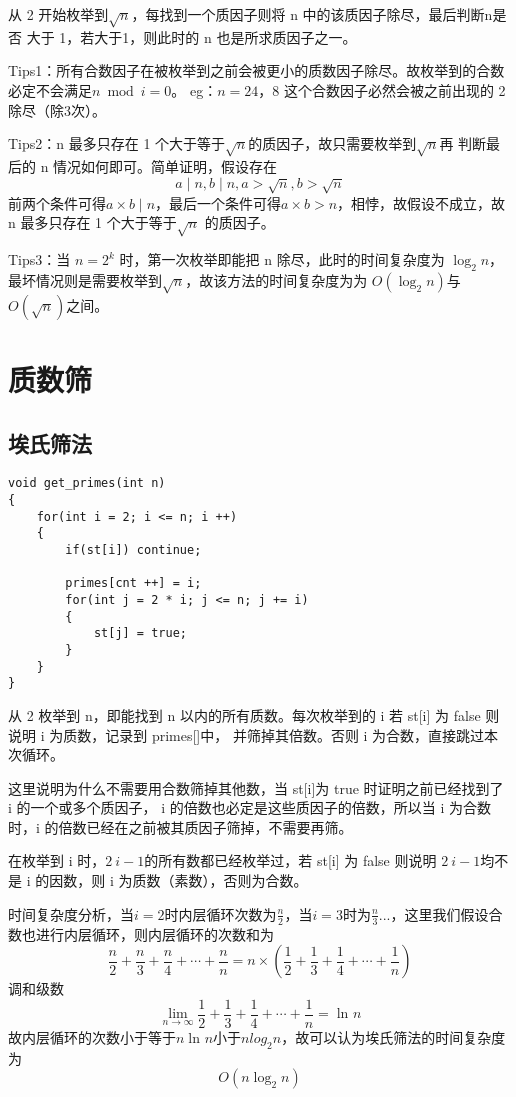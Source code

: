 \documentclass[]{book}
\begin{document}
从 2 开始枚举到$\sqrt{n}$，每找到一个质因子则将 n 中的该质因子除尽，最后判断n是否
大于 1，若大于1，则此时的 n 也是所求质因子之一。

Tips1：所有合数因子在被枚举到之前会被更小的质数因子除尽。故枚举到的合数必定不会满足$n \bmod i = 0$。
eg：$n = 24$，8 这个合数因子必然会被之前出现的 2 除尽（除3次）。

Tips2：n 最多只存在 1 个大于等于$\sqrt{n}$的质因子，故只需要枚举到$\sqrt{n}$再
判断最后的 n 情况如何即可。简单证明，假设存在
\[ a \mid n, b \mid n, a>\sqrt{n}, b>\sqrt{n}\]
前两个条件可得$a \times b \mid n$，最后一个条件可得$a \times b > n$，相悖，故假设不成立，故 n 最多只存在
1 个大于等于$ \sqrt{n}$ 的质因子。

Tips3：当 $n = 2^k$ 时，第一次枚举即能把 n 除尽，此时的时间复杂度为 $\log_{2}{n}$，
最坏情况则是需要枚举到$\sqrt{n}$，故该方法的时间复杂度为为 $O(\log_{2}{n})$与$O(\sqrt{n})$之间。
\section{质数筛}
\subsection{埃氏筛法}
\begin{lstlisting}
void get_primes(int n)
{
    for(int i = 2; i <= n; i ++)
    {
        if(st[i]) continue;
        
        primes[cnt ++] = i;
        for(int j = 2 * i; j <= n; j += i)
        {
            st[j] = true;
        }
    }
}
\end{lstlisting}

从 2 枚举到 n，即能找到 n 以内的所有质数。每次枚举到的 i 若 st[i] 为 false 则说明 i 为质数，记录到 primes[]中，
并筛掉其倍数。否则 i 为合数，直接跳过本次循环。

这里说明为什么不需要用合数筛掉其他数，当 st[i]为 true 时证明之前已经找到了 i 的一个或多个质因子，
i 的倍数也必定是这些质因子的倍数，所以当 i 为合数时，i 的倍数已经在之前被其质因子筛掉，不需要再筛。

在枚举到 i 时，$2 ~ i-1$的所有数都已经枚举过，若 st[i] 为 false 则说明 $2 ~ i-1$均不是 i 的因数，则 i 为质数（素数），否则为合数。

时间复杂度分析，当$i=2$时内层循环次数为$\frac{n}{2}$，当$i=3$时为$\frac{n}{3}$...，这里我们假设合数也进行内层循环，则内层循环的次数和为
\[\frac{n}{2} + \frac{n}{3} + \frac{n}{4} + \cdots + \frac{n}{n} = n \times (\frac{1}{2} + \frac{1}{3} + \frac{1}{4} + \cdots + \frac{1}{n})\]
调和级数
\[\lim_{n \to \infty} \frac{1}{2} + \frac{1}{3} + \frac{1}{4} + \cdots + \frac{1}{n} = \ln_{}{n}\]
故内层循环的次数小于等于$n\ln_{}{n}$小于$nlog_{2}{n}$，故可以认为埃氏筛法的时间复杂度为
\[O(n\log_{2}{n})\]
\end{document}

